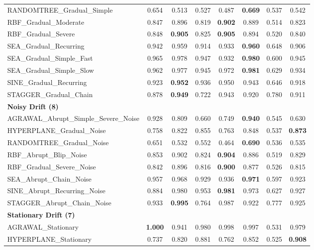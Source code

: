 \begin{table}[ht]
\begin{tabular}{l|ccccccc}
RANDOMTREE\_Gradual\_Simple & 0.654 & 0.513 & 0.527 & 0.487 & \textbf{0.669} & 0.537 & 0.542 \\
RBF\_Gradual\_Moderate & 0.847 & 0.896 & 0.819 & \textbf{0.902} & 0.889 & 0.514 & 0.823 \\
RBF\_Gradual\_Severe & 0.848 & \textbf{0.905} & 0.825 & \textbf{0.905} & 0.894 & 0.520 & 0.840 \\
SEA\_Gradual\_Recurring & 0.942 & 0.959 & 0.914 & 0.933 & \textbf{0.960} & 0.648 & 0.906 \\
SEA\_Gradual\_Simple\_Fast & 0.965 & 0.978 & 0.947 & 0.932 & \textbf{0.980} & 0.600 & 0.945 \\
SEA\_Gradual\_Simple\_Slow & 0.962 & 0.977 & 0.945 & 0.972 & \textbf{0.981} & 0.629 & 0.934 \\
SINE\_Gradual\_Recurring & 0.923 & \textbf{0.952} & 0.936 & 0.950 & 0.943 & 0.646 & 0.918 \\
STAGGER\_Gradual\_Chain & 0.878 & \textbf{0.949} & 0.722 & 0.943 & 0.920 & 0.780 & 0.911 \\
\multicolumn{8}{l}{\textbf{Noisy Drift (8)}} \\
AGRAWAL\_Abrupt\_Simple\_Severe\_Noise & 0.928 & 0.809 & 0.660 & 0.749 & \textbf{0.940} & 0.545 & 0.630 \\
HYPERPLANE\_Gradual\_Noise & 0.758 & 0.822 & 0.855 & 0.763 & 0.848 & 0.537 & \textbf{0.873} \\
RANDOMTREE\_Gradual\_Noise & 0.651 & 0.532 & 0.552 & 0.464 & \textbf{0.690} & 0.536 & 0.535 \\
RBF\_Abrupt\_Blip\_Noise & 0.853 & 0.902 & 0.824 & \textbf{0.904} & 0.886 & 0.519 & 0.829 \\
RBF\_Gradual\_Severe\_Noise & 0.842 & 0.896 & 0.816 & \textbf{0.900} & 0.877 & 0.526 & 0.815 \\
SEA\_Abrupt\_Chain\_Noise & 0.957 & 0.968 & 0.929 & 0.936 & \textbf{0.971} & 0.597 & 0.923 \\
SINE\_Abrupt\_Recurring\_Noise & 0.884 & 0.980 & 0.953 & \textbf{0.981} & 0.973 & 0.627 & 0.927 \\
STAGGER\_Abrupt\_Chain\_Noise & 0.933 & \textbf{0.995} & 0.764 & 0.987 & 0.922 & 0.777 & 0.925 \\
\multicolumn{8}{l}{\textbf{Stationary Drift (7)}} \\
AGRAWAL\_Stationary & \textbf{1.000} & 0.941 & 0.980 & 0.998 & 0.997 & 0.531 & 0.979 \\
HYPERPLANE\_Stationary & 0.737 & 0.820 & 0.881 & 0.762 & 0.852 & 0.525 & \textbf{0.908} \\

\end{tabular}
\end{table}
